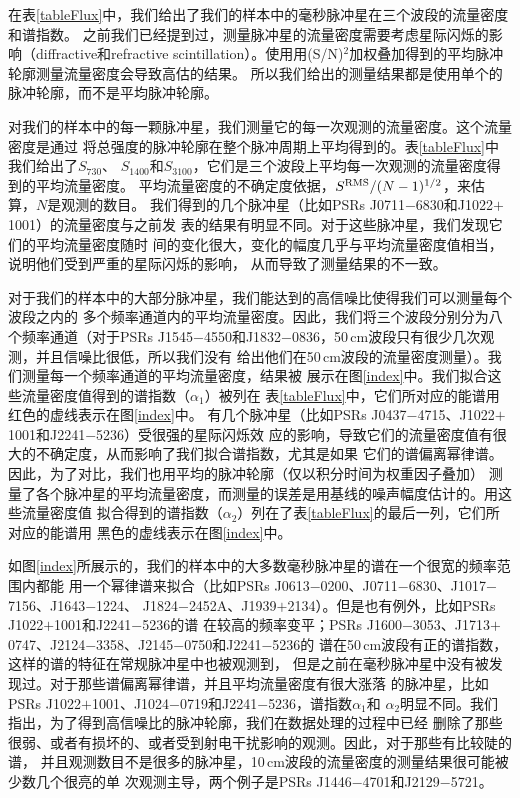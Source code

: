 在表\ref{tableFlux}中，我们给出了我们的样本中的毫秒脉冲星在三个波段的流量密度和谱指数。
之前我们已经提到过，测量脉冲星的流量密度需要考虑星际闪烁的影响（diffractive和refractive 
scintillation）。使用用(S/N)$^2$加权叠加得到的平均脉冲轮廓测量流量密度会导致高估的结果。
所以我们给出的测量结果都是使用单个的脉冲轮廓，而不是平均脉冲轮廓。

对我们的样本中的每一颗脉冲星，我们测量它的每一次观测的流量密度。这个流量密度是通过
将总强度的脉冲轮廓在整个脉冲周期上平均得到的。表\ref{tableFlux}中我们给出了$S_{730}$、
$S_{1400}$和$S_{3100}$，它们是三个波段上平均每一次观测的流量密度得到的平均流量密度。
平均流量密度的不确定度依据，$S^{\rm{RMS}}/(N-1)^{1/2}$，来估算，$N$是观测的数目。
%
我们得到的几个脉冲星（比如PSRs J0711$-$6830和J1022$+$1001）的流量密度与之前发
表的结果\supercite{Yan11a}有明显不同。对于这些脉冲星，我们发现它们的平均流量密度随时
间的变化很大，变化的幅度几乎与平均流量密度值相当，说明他们受到严重的星际闪烁的影响，
从而导致了测量结果的不一致。

对于我们的样本中的大部分脉冲星，我们能达到的高信噪比使得我们可以测量每个波段之内的
多个频率通道内的平均流量密度。因此，我们将三个波段分别分为八个频率通道（对于PSRs 
J1545$-$4550和J1832$-$0836，50\,cm波段只有很少几次观测，并且信噪比很低，所以我们没有
给出他们在50\,cm波段的流量密度测量）。我们测量每一个频率通道的平均流量密度，结果被
展示在图\ref{index}中。我们拟合这些流量密度值得到的谱指数（$\alpha_1$）被列在
表\ref{tableFlux}中，它们所对应的能谱用红色的虚线表示在图\ref{index}中。
%
有几个脉冲星（比如PSRs J0437$-$4715、J1022$+$1001和J2241$-$5236）受很强的星际闪烁效
应的影响，导致它们的流量密度值有很大的不确定度，从而影响了我们拟合谱指数，尤其是如果
它们的谱偏离幂律谱。因此，为了对比，我们也用平均的脉冲轮廓（仅以积分时间为权重因子叠加）
测量了各个脉冲星的平均流量密度，而测量的误差是用基线的噪声幅度估计的。用这些流量密度值
拟合得到的谱指数（$\alpha_2$）列在了表\ref{tableFlux}的最后一列，它们所对应的能谱用
黑色的虚线表示在图\ref{index}中。

如图\ref{index}所展示的，我们的样本中的大多数毫秒脉冲星的谱在一个很宽的频率范围内都能
用一个幂律谱来拟合（比如PSRs J0613$-$0200、J0711$-$6830、J1017$-$7156、J1643$-$1224、
J1824$-$2452A、J1939$+$2134）。但是也有例外，比如PSRs J1022$+$1001和J2241$-$5236的谱
在较高的频率变平；PSRs J1600$-$3053、J1713$+$0747、J2124$-$3358、J2145$-$0750和J2241$-$5236的
谱在50\,cm波段有正的谱指数，这样的谱的特征在常规脉冲星中也被观测到\supercite{Kijak11}，
但是之前在毫秒脉冲星中没有被发现过。对于那些谱偏离幂律谱，并且平均流量密度有很大涨落
的脉冲星，比如PSRs J1022$+$1001、J1024$-$0719和J2241$-$5236，谱指数$\alpha_1$和
$\alpha_2$明显不同。我们指出，为了得到高信噪比的脉冲轮廓，我们在数据处理的过程中已经
删除了那些很弱、或者有损坏的、或者受到射电干扰影响的观测。因此，对于那些有比较陡的谱，
并且观测数目不是很多的脉冲星，10\,cm波段的流量密度的测量结果很可能被少数几个很亮的单
次观测主导，两个例子是PSRs J1446$-$4701和J2129$-$5721。


